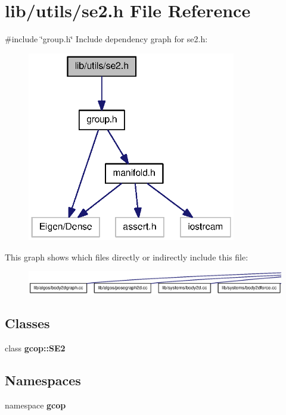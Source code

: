 \section{lib/utils/se2.h \-File \-Reference}
\label{se2_8h}
{\ttfamily \#include \char`\"{}group.\-h\char`\"{}}\*
\-Include dependency graph for se2.\-h\-:\nopagebreak
\begin{figure}[H]
\begin{center}
\leavevmode
\includegraphics[width=258pt]{se2_8h__incl}
\end{center}
\end{figure}
\-This graph shows which files directly or indirectly include this file\-:\nopagebreak
\begin{figure}[H]
\begin{center}
\leavevmode
\includegraphics[width=350pt]{se2_8h__dep__incl}
\end{center}
\end{figure}
\subsection*{\-Classes}
\begin{DoxyCompactItemize}
\item 
class {\bf gcop\-::\-S\-E2}
\end{DoxyCompactItemize}
\subsection*{\-Namespaces}
\begin{DoxyCompactItemize}
\item 
namespace {\bf gcop}
\end{DoxyCompactItemize}
